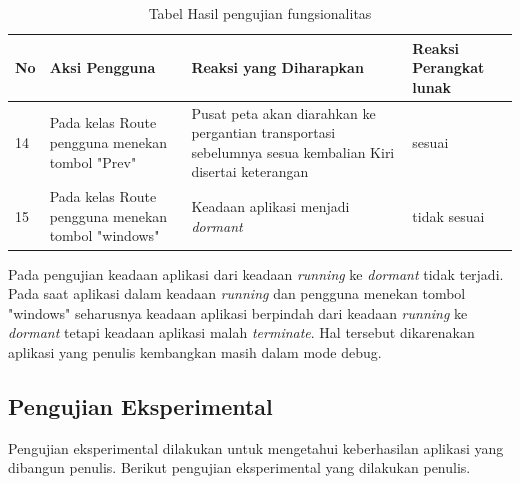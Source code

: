 \begin{table}[h!]
	\centering
		\begin{tabular}{|p{1cm}|p{4cm}|p{6cm}|p{3cm}|}\hline
				No & Aksi Pengguna & Reaksi yang Diharapkan & Reaksi Perangkat lunak \\ \hline
				14 & Pada kelas Route pengguna menekan tombol "Prev" & Pusat peta akan diarahkan ke pergantian transportasi sebelumnya sesua kembalian Kiri disertai keterangan & sesuai \\ \hline
				15 & Pada kelas Route pengguna menekan tombol "windows" & Keadaan aplikasi menjadi \textit{dormant} & tidak sesuai \\ \hline
		\end{tabular}
	\caption{Tabel Hasil pengujian fungsionalitas}
	\label{tab:TabelHasilPengujianFungsionalitas}
\end{table}

\hspace{0.5cm} Pada pengujian keadaan aplikasi dari keadaan \textit{running} ke \textit{dormant} tidak terjadi. Pada saat aplikasi dalam keadaan \textit{running} dan pengguna menekan tombol "windows" seharusnya keadaan aplikasi berpindah dari keadaan \textit{running} ke \textit{dormant} tetapi keadaan aplikasi malah \textit{terminate}. Hal tersebut dikarenakan aplikasi yang penulis kembangkan masih dalam mode debug.

\subsection{Pengujian Eksperimental}
\label{lab:Pengujian Eksperimental}
\hspace{0.5cm} Pengujian eksperimental dilakukan untuk mengetahui keberhasilan aplikasi yang dibangun penulis. Berikut pengujian eksperimental yang dilakukan penulis.

